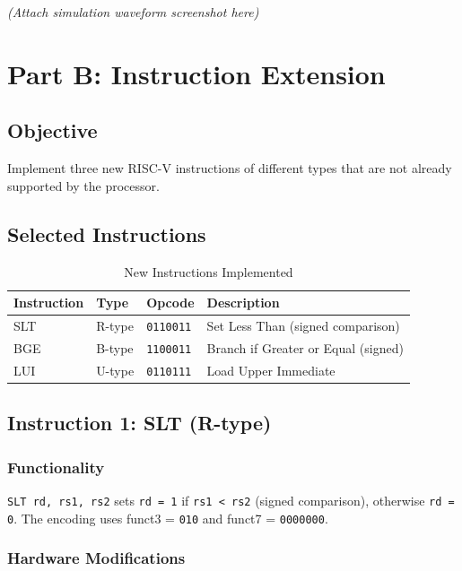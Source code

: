 \documentclass[12pt,a4paper]{article}
\begin{document}
\textit{(Attach simulation waveform screenshot here)}

\section{Part B: Instruction Extension}

\subsection{Objective}
Implement three new RISC-V instructions of different types that are not already supported by the processor.

\subsection{Selected Instructions}

\begin{table}[h]
\centering
\caption{New Instructions Implemented}
\begin{tabular}{@{}llll@{}}
\toprule
\textbf{Instruction} & \textbf{Type} & \textbf{Opcode} & \textbf{Description} \\
\midrule
SLT  & R-type & \texttt{0110011} & Set Less Than (signed comparison) \\
BGE  & B-type & \texttt{1100011} & Branch if Greater or Equal (signed) \\
LUI  & U-type & \texttt{0110111} & Load Upper Immediate \\
\bottomrule
\end{tabular}
\end{table}

\subsection{Instruction 1: SLT (R-type)}

\subsubsection{Functionality}
\texttt{SLT rd, rs1, rs2} sets \texttt{rd = 1} if \texttt{rs1 < rs2} (signed comparison), otherwise \texttt{rd = 0}. The encoding uses funct3 = \texttt{010} and funct7 = \texttt{0000000}.

\subsubsection{Hardware Modifications}
\end{document}
